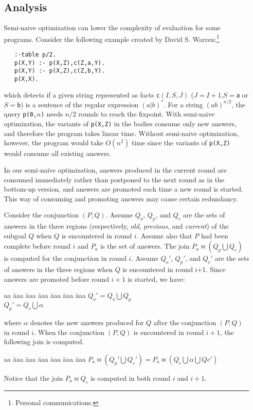 \documentclass{tlp}
\begin{document}
\subsection{\label{sec:analysis}Analysis}
Semi-naive optimization can lower the complexity of evaluation for some programs. Consider the following example created by David S. Warren:\footnote{Personal communications.}
\begin{verbatim}
   :-table p/2.
   p(X,Y) :- p(X,Z),c(Z,a,Y).
   p(X,Y) :- p(X,Z),c(Z,b,Y).
   p(X,X).
\end{verbatim}
which detects if a given string represented as facts {\tt c}$(I,S,J)$ ($J=I+1$,$S=${\tt a} or $S=${\tt b})  is a sentence of the regular expression $(a|b)^*$. For a string $(ab)^{n/2}$, the query {\tt p(0,$n$)} needs $n/2$ rounds to reach the fixpoint. With semi-naive optimization, the variants of {\tt p(X,Z)} in the bodies consume only new answers, and therefore the program takes linear time. Without semi-naive optimization, however, the program would take $O(n^2)$ time since the variants of {\tt p(X,Z)} would consume all existing answers.

In our semi-naive optimization, answers produced in the current round are consumed immediately rather than postponed to the next round as in the bottom-up version, and answers are promoted each time a new round is started. This way of consuming and promoting answers may cause certain redundancy. 

Consider the conjunction $(P,Q)$. Assume $Q_o$, $Q_p$, and $Q_c$ are the sets of answers in the three regions (respectively, {\it old}, {\it previous}, and {\it current}) of the subgoal $Q$ when $Q$ is encountered in round $i$. Assume also that $P$ had been complete before round $i$ and $P_a$ is the set of answers. The join $P_a \Join (Q_p \bigcup Q_c)$ is computed for the conjunction in round $i$. Assume $Q_o'$, $Q_p'$, and $Q_c'$ are the sets of answers in the three regions when $Q$ is encountered in round i+1. Since answers are promoted before round $i+1$ is started, we have:
\begin{tabbing}
aa \= aaa \= aaa \= aaa \= aaa \= aaa \= aaa \kill
\> $Q_o' = Q_o \bigcup Q_p$ \\
\> $Q_p' = Q_c \bigcup \alpha$ 
\end{tabbing}
where $\alpha$ denotes the new answers produced for $Q$ after the conjunction $(P,Q)$ in round $i$. When the conjunction $(P,Q)$ is encountered in round $i+1$, the following join is computed.
\begin{tabbing}
aa \= aaa \= aaa \= aaa \= aaa \= aaa \= aaa \kill
\> $P_a \Join (Q_p' \bigcup Q_c') = P_a \Join (Q_c \bigcup \alpha \bigcup Qc')$
\end{tabbing}
Notice that the join $P_a \Join Q_c$ is computed in both round $i$ and $i+1$.
\end{document}
